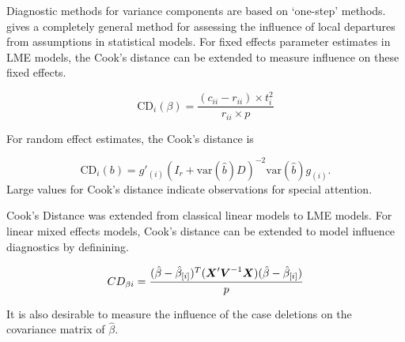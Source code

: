 \documentclass[12pt, a4paper]{article}
\begin{document}
Diagnostic methods for variance components are based on `one-step' methods. \citet{cook86} gives a completely general method for assessing the influence of local departures from assumptions in statistical models. For fixed effects parameter estimates in LME models, the  Cook's distance can be extended to measure influence on these fixed effects.

\[
\mbox{CD}_{i}(\beta) = \frac{(c_{ii} - r_{ii}) \times t^2_{i}}{r_{ii} \times p}
\]

For random effect estimates, the  Cook's distance is

\[
\mbox{CD}_{i}(b) = g{\prime}_{(i)} (I_{r} + \mbox{var}(\hat{b})D)^{-2}\mbox{var}(\hat{b})g_{(i)}.
\]
Large values for Cook's distance indicate observations for special attention.

Cook's Distance was extended from classical linear models to LME models.  For linear mixed effects models, Cook's distance can be extended to model influence diagnostics by definining.

\[ CD_{\beta i} = {(\hat{\beta} - \hat{\beta}_{[i]})^{T}(\boldsymbol{X}^{\prime}\boldsymbol{V}^{-1}\boldsymbol{X}) (\hat{\beta} - \hat{\beta}_{[i]}) \over p}\]

It is also desirable to measure the influence of the case deletions on the covariance matrix of $\hat{\beta}$.



\end{document}
